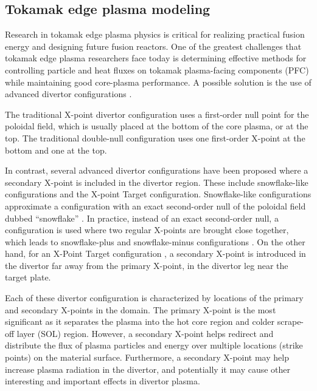 \subsection{\label{sec:level2}Tokamak edge plasma modeling}
%
Research in tokamak edge plasma physics is critical for realizing
practical fusion energy and designing future fusion reactors. One of
the greatest challenges that tokamak edge plasma researchers face
today is determining effective methods for controlling particle and
heat fluxes on tokamak plasma-facing components (PFC) while maintaining good core-plasma performance. A possible
solution is the use of advanced divertor configurations
\cite{Kotschenreuther2007}.

The traditional X-point divertor configuration uses a first-order null
point for the poloidal field, which is usually placed at the bottom of
the core plasma, or at the top. The traditional double-null
configuration uses one first-order X-point at the bottom and one at
the top.

In contrast, several advanced divertor configurations have been
proposed where a secondary X-point is included in the divertor
region. These include snowflake-like configurations and the X-point
Target configuration. Snowflake-like configurations approximate a
configuration with an exact second-order null of the poloidal field
dubbed ``snowflake'' \cite{Ryutov2007}. In practice, instead of an
exact second-order null, a configuration is used where two regular
X-points are brought close together, which leads to snowflake-plus and
snowflake-minus configurations \cite{Ryutov2008}. On the other hand,
for an X-Point Target configuration \cite{LaBombard2015}, a secondary
X-point is introduced in the divertor far away from the primary
X-point, in the divertor leg near the target plate.

Each of these divertor configuration is characterized by locations of
the primary and secondary X-points in the domain. The primary X-point
is the most significant as it separates the plasma into the hot core
region and colder scrape-off layer (SOL) region. However, a secondary
X-point helps redirect and distribute the flux of plasma particles and
energy over multiple locations (strike points) on the material
surface.  Furthermore, a secondary X-point may help increase plasma
radiation in the divertor, and potentially it may cause other
interesting and important effects in divertor plasma.



